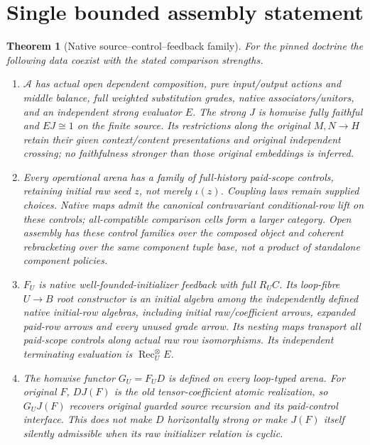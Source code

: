 \documentclass[11pt]{article}
\newtheorem{theorem}{Theorem}\newtheorem{proposition}{Proposition}
\begin{document}
\section{Single bounded assembly statement}
\begin{theorem}[Native source--control--feedback family]
For the pinned doctrine the following data coexist with the stated
comparison strengths.
\begin{enumerate}
\item $\mathcal A$ has actual open dependent composition, pure input/output
actions and middle balance, full weighted substitution grades, native
associators/unitors, and an independent strong evaluator $E$.
The strong $J$ is homwise fully faithful and $EJ\cong1$ on the finite
source. Its restrictions along the original $M,N\to H$ retain their given
context/content presentations and original independent crossing; no
faithfulness stronger than those original embeddings is inferred.
\item Every operational arena has a family of full-history paid-scope
controls, retaining initial raw seed $z$, not merely $\iota(z)$.
Coupling laws remain supplied choices. Native maps admit the canonical
contravariant conditional-row lift on these controls; all-compatible
comparison cells form a larger category. Open assembly has these control
families over the composed object and coherent rebracketing over the same
component tuple base, not a product of standalone component policies.
\item $F_U$ is native well-founded-initializer feedback with full $R_U C$.
Its loop-fibre $U\to B$ root constructor is an initial algebra among the independently defined
native initial-row algebras, including initial raw/coefficient arrows,
expanded paid-row arrows and every unused grade arrow. Its nesting maps
transport all paid-scope controls along actual raw row isomorphisms.
Its independent terminating evaluation is $\operatorname{Rec}^{\otimes}_U E$.
\item The homwise functor $G_U=F_U D$ is defined on every loop-typed arena.
For original $F$, $D J(F)$ is the old tensor-coefficient atomic realization,
so $G_UJ(F)$ recovers original guarded source recursion and its paid-control
interface. This does not make $D$ horizontally strong or make $J(F)$ itself
silently admissible when its raw initializer relation is cyclic.
\end{enumerate}
\end{theorem}
\end{document}
